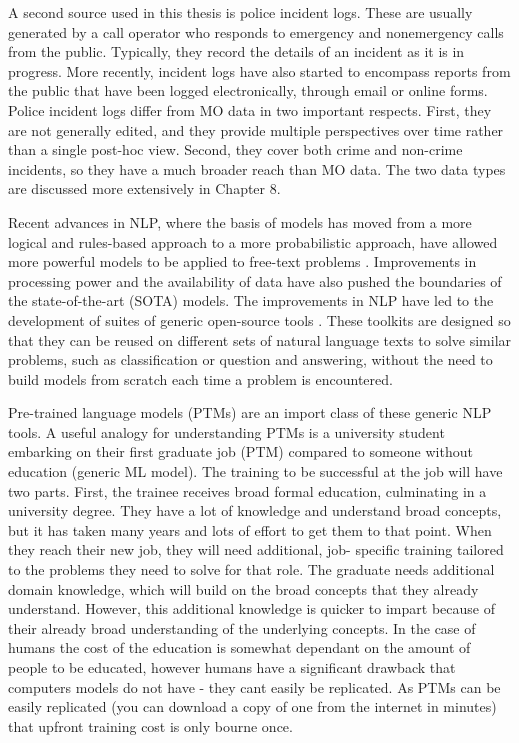 A second source used in this thesis is police incident logs. These are usually generated by a call operator who responds to emergency and nonemergency calls from the public. Typically, they record the details of an incident as it is in progress. More recently, incident logs have also started to encompass reports from the public that have been logged electronically, through email or online forms. Police incident logs differ from MO data in two important respects. First, they are not generally edited, and they provide multiple perspectives over time rather than a single post-hoc view. Second, they cover both crime and non-crime incidents, so they have a much broader reach than MO data. The two data types are discussed more extensively in Chapter 8.

Recent advances in NLP, where the basis of models has moved from a more logical and rules-based approach to a more probabilistic approach, have allowed more powerful models to be applied to free-text problems \parencite{kumar2011natural}. Improvements in processing power and the availability of data have also pushed the boundaries of the state-of-the-art (SOTA) models. The improvements in NLP have led to the development of suites of generic open-source tools \parencite{manning2014stanford, benoit2018quanteda, loper2002nltk}. These toolkits are designed so that they can be reused on different sets of natural language texts to solve similar problems, such as classification or question and answering, without the need to build models from scratch each time a problem is encountered.

Pre-trained language models (PTMs) are an import class of these generic NLP tools. A useful analogy for understanding PTMs is a university student embarking on their first graduate job (PTM) compared to someone without education (generic ML model). The training to be successful at the job will have two parts. First, the trainee receives broad formal education,  culminating in a university degree. They have a lot of knowledge and understand broad concepts, but it has taken many years and lots of effort to get them to that point. When they reach their new job, they will need additional, job- specific training tailored to the problems they need to solve for that role. The graduate needs additional domain knowledge, which will build on the broad concepts that they already understand. However, this additional knowledge is quicker to impart because of their already broad understanding of the underlying concepts. In the case of humans the cost of the education is somewhat dependant on the amount of people to be educated, however humans have a significant drawback that computers models do not have - they cant easily be replicated. As PTMs can be easily replicated (you can download a copy of one from the internet in minutes) that upfront training cost is only bourne once.

